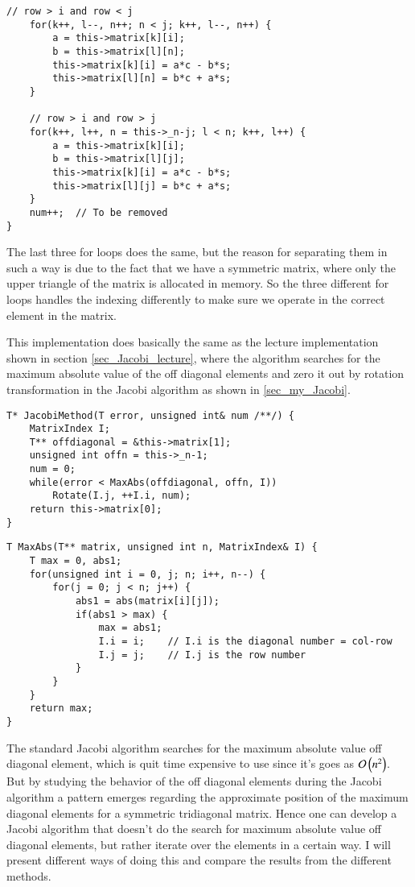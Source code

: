 \documentclass[11pt,english,a4paper]{article}
\begin{document}
\begin{flushleft}
\begin{lstlisting}[title={\texttt{Matrix<MatrixType::Symmetric, T>::Rotate}}]
   	// row > i and row < j
   	for(k++, l--, n++; n < j; k++, l--, n++) {
   		a = this->matrix[k][i];
   		b = this->matrix[l][n];
   		this->matrix[k][i] = a*c - b*s;
   		this->matrix[l][n] = b*c + a*s;
   	}
        
   	// row > i and row > j
   	for(k++, l++, n = this->_n-j; l < n; k++, l++) {
   		a = this->matrix[k][i];
   		b = this->matrix[l][j];
   		this->matrix[k][i] = a*c - b*s;
   		this->matrix[l][j] = b*c + a*s;
   	}
   	num++;	// To be removed
}
\end{lstlisting}

The last three for loops does the same, but the reason for separating them in such a way is due to the fact that we have a symmetric matrix, where only the upper triangle of the matrix is allocated in memory. So the three different for loops handles the indexing differently to make sure we operate in the correct element in the matrix.


This implementation does basically the same as the lecture implementation shown in section \ref{sec_Jacobi_lecture}, where the algorithm searches for the maximum absolute value of the off diagonal elements and zero it out by rotation transformation in the Jacobi algorithm as shown in \ref{sec_my_Jacobi}.

\begin{lstlisting}[title={\texttt{Matrix<MatrixType::Symmetric, T>::JacobiMethod}}]
T* JacobiMethod(T error, unsigned int& num /**/) {
	MatrixIndex I;
	T** offdiagonal = &this->matrix[1];
	unsigned int offn = this->_n-1;
	num = 0;                                    
	while(error < MaxAbs(offdiagonal, offn, I)) 
		Rotate(I.j, ++I.i, num);
	return this->matrix[0];
}
\end{lstlisting}

\begin{lstlisting}[title={\texttt{Matrix<MatrixType::Symmetric, T>::MaxAbs}}]
T MaxAbs(T** matrix, unsigned int n, MatrixIndex& I) {
	T max = 0, abs1;
	for(unsigned int i = 0, j; n; i++, n--) {
		for(j = 0; j < n; j++) {
			abs1 = abs(matrix[i][j]);
			if(abs1 > max) {
				max = abs1;
				I.i = i; 	// I.i is the diagonal number = col-row
				I.j = j;    // I.j is the row number
			}
		}
	}
	return max;
}
\end{lstlisting}


The standard Jacobi algorithm searches for the maximum absolute value off diagonal element, which is quit time expensive to use since it's goes as $\mathcal{O}\left({n^2}\right)$. But by studying the behavior of the off diagonal elements during the Jacobi algorithm a pattern emerges regarding the approximate position of the maximum diagonal elements for a symmetric  tridiagonal matrix. Hence one can develop a Jacobi algorithm that doesn't do the search for maximum absolute value off diagonal elements, but rather iterate over the elements in a certain way. I will present different ways of doing this and compare the results from the different methods. \linebreak


\end{flushleft}
\end{document}
